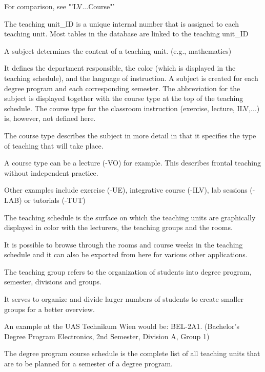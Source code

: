 {For comparison, see "'LV...Course"'

The teaching unit\_ID is a unique internal number that is assigned to each teaching unit.
Most tables in the database are linked to the teaching unit\_ID

A subject determines the content of a teaching unit. (e.g., mathematics)

It defines the department responsible, the color (which is displayed in the teaching schedule), and the language of instruction. A subject is created for each degree program and each corresponding semester. The abbreviation for the subject is displayed together with the course type at the top of the teaching schedule. 
The course type for the classroom instruction (exercise, lecture, ILV,...) is, however, not defined here.

	{
The course type describes the subject in more detail in that it specifies the type of teaching that will take place. 

A course type can be a lecture (-VO) for example. This describes frontal teaching without independent practice. 

Other examples include exercise (-UE), integrative course (-ILV), lab sessions (-LAB) or tutorials (-TUT)

The teaching schedule is the surface on which the teaching units are graphically displayed in color with the lecturers, the teaching groups and the rooms. 

It is possible to browse through the rooms and course weeks in the teaching schedule and it can also be exported from here for various other applications.

The teaching group refers to the organization of students into degree program, semester, divisions and groups. 

It serves to organize and divide larger numbers of students to create smaller groups for a better overview. 

An example at the UAS Technikum Wien would be: BEL-2A1. (Bachelor's Degree Program Electronics, 2nd Semester, Division A, Group 1) 

The degree program course schedule is the complete list of all teaching units that are to be planned for a semester of a degree program.

}}
